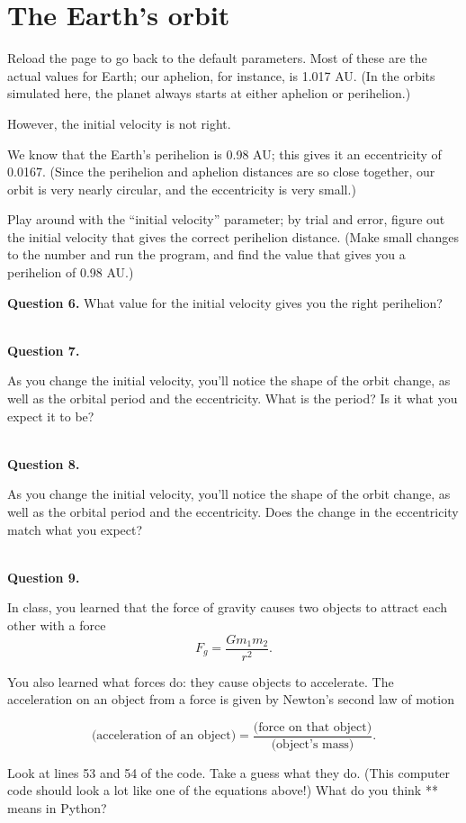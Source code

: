 \documentclass[11pt]{article}
\begin{document}
\section{The Earth's orbit}

Reload the page to go back to the default parameters. Most of these are the actual values for Earth; our aphelion, for instance, is 1.017 AU. (In the orbits simulated here, the planet always starts at either aphelion or perihelion.) 

However, the initial velocity is not right.

We know that the Earth's perihelion is 0.98 AU; this gives it an eccentricity of 0.0167. (Since the perihelion and aphelion distances are so close together, our orbit is very nearly circular, and the eccentricity is very small.)

Play around with the ``initial velocity'' parameter; by trial and error, figure out the initial velocity that gives the correct perihelion distance. (Make small changes to the number and run the program, and find the value that gives you a perihelion of 0.98 AU.)

\medskip

{\textbf{Question 6.} What value for the initial velocity gives you the right perihelion?}

\vspace*{1.5cm}
\hrulefill\\

\textbf{Question 7.} 

As you change the initial velocity, you'll notice the shape of the orbit change, as well as the orbital period and the eccentricity. What is the period? Is it what you expect it to be?

\vspace*{1.5cm}
\hrulefill\\

\textbf{Question 8.} 

As you change the initial velocity, you'll notice the shape of the orbit change, as well as the orbital period and the eccentricity. Does the change in the eccentricity match what you expect? 

\vspace*{1.5cm}
\hrulefill\\

\textbf{Question 9.} 

In class, you learned that the force of gravity causes two objects to attract each other with a force $$F_g = \frac{Gm_1m_2}{r^2}.$$

You also learned what forces do: they cause objects to accelerate. The acceleration on an object from a force is given by Newton's second law of motion

$$ \mbox{(acceleration of an object)} = \frac{\mbox{(force on that object)}}{\mbox{(object's mass)}}.$$

Look at lines 53 and 54 of the code. Take a guess what they do. (This computer code should look a lot like one of the equations above!) What do you think ** means in Python?

\vspace*{3cm}
\hrulefill\\
\end{document}
